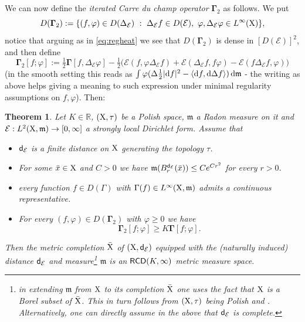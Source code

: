 \documentclass[11pt]{article}
\numberwithin{equation}{section}
\newtheorem{theorem}{Theorem}[section]
\newcommand{\R}{\mathbb{R}}
\newcommand{\X}{{\rm X}}
\newcommand{\sfd}{{\sf d}}
\newcommand{\mm}{{\mathfrak m}}
\newcommand{\RCD}{{\sf RCD}}
\renewcommand{\d}{{\rm d}}
\newcommand\la{\langle}
\newcommand\ra{\rangle}
\newcommand{\Ggamma}{{\mathbf \Gamma}}
\begin{document}
We can now define the \emph{iterated Carre du champ operator} $\Ggamma_2$ as follows. We put 
\[
D(\Ggamma_2):=\{(f,\varphi)\in D(\Delta_{\mathcal E})\ :\ \Delta_{\mathcal E}f\in D(\mathcal E),\ \varphi,\Delta_{\mathcal E}\varphi\in L^\infty(\X)\},
\] 
notice that arguing as in \eqref{eq:regheat}  we see that $D(\Ggamma_2)$ is dense in $[D(\mathcal E)]^2$, and then define
\[
\Ggamma_2[f;\varphi]:=\tfrac12\Ggamma[f,\Delta_{\mathcal E}\varphi]-\tfrac12\big(\mathcal E(f,\varphi\Delta_{\mathcal E}f)+\mathcal E(\Delta_{\mathcal E}f,f\varphi)-\mathcal E(f\Delta_{\mathcal E}f,\varphi)\big)
\]
(in the smooth setting this reads as $\int\varphi(\Delta \tfrac12|\d f|^2-\la\d f,\d\Delta f\ra)\,\d\mm$ - the writing as above helps giving a meaning to such expression under minimal regularity assumptions on $f,\varphi$). Then:
\begin{theorem}\label{thm:reprfin}
Let $K\in\R$,  $(\X,\tau)$ be a Polish space, $\mm$ a Radon measure on it and $\mathcal E:L^2(\X,\mm)\to[0,\infty]$ a strongly local Dirichlet form. Assume that
\begin{itemize}
\item[a')] $\sfd_\mathcal E$ is a finite distance on $\X$ generating the topology $\tau$.
\item[b')] For some $\bar x\in\X$ and $C>0$ we have $\mm(B_r^{\sfd_\mathcal E}(\bar x))\leq Ce^{Cr^2}$ for every $r>0$.
\item[c')] every function $f\in D(\Gamma) $ with $\Gamma(f)\in L^\infty(\X,\mm)$ admits a continuous representative.
\item[d')] For every $(f,\varphi)\in D(\Ggamma_2)$ with $\varphi\geq 0$ we have
\begin{equation}
\label{eq:Gamma2cond}
\Ggamma_2[f;\varphi]\geq K\Ggamma[f;\varphi].
\end{equation}
\end{itemize}
Then the metric completion $\bar\X$ of $(\X,\sfd_{\mathcal E})$ equipped with the (naturally induced) distance $\sfd_{\mathcal E}$ and measure\footnote{in extending $\mm$ from $\X$ to its completion $\bar\X$ one uses the fact that $\X$ is a Borel subset of $\bar \X$. This in turn follows from  $(\X,\tau)$ being Polish and \cite[Theorem 6.8.6]{Bogachev07}. Alternatively, one can directly assume in the above that $\sfd_{\mathcal E}$ is complete.} $\mm$ is an $\RCD(K,\infty)$ metric measure space. 
\end{theorem}
\end{document}
